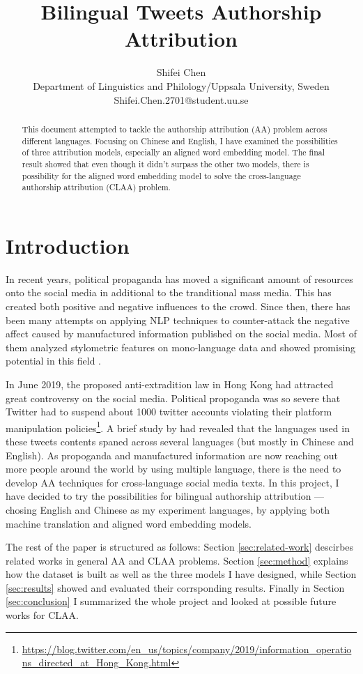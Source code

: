 \documentclass[11pt,a4paper]{article}
\title{Bilingual Tweets Authorship Attribution}
\author{
 Shifei Chen \\
 Department of Linguistics and Philology/Uppsala University, Sweden \\
  {\sf Shifei.Chen.2701@student.uu.se} \\
}
\date{}
\begin{document}
\maketitle
\begin{abstract}
  This document attempted to tackle the authorship attribution (AA) problem across different languages. Focusing on Chinese and English, I have examined the possibilities of three attribution models, especially an aligned word embedding model. The final result showed that even though it didn't surpass the other two models, there is possibility for the aligned word embedding model to solve the cross-language authorship attribution (CLAA) problem.
\end{abstract}

\section{Introduction}
In recent years, political propaganda has moved a significant amount of resources onto the social media in additional to the tranditional mass media. This has created both positive and negative influences to the crowd. Since then, there has been many attempts on applying NLP techniques to counter-attack the negative affect caused by manufactured information published on the social media. Most of them analyzed stylometric features on mono-language data and showed promising potential in this field \cite{rocha2016authorship}.

In June 2019, the proposed anti-extradition law in Hong Kong had attracted great controversy on the social media. Political propoganda was so severe that Twitter had to suspend about 1000 twitter accounts violating their platform manipulation policies\footnote{\raggedright\url{https://blog.twitter.com/en_us/topics/company/2019/information_operations_directed_at_Hong_Kong.html}}. A brief study by \citet{wood_mcminn_feng_2019} had revealed that the languages used in these tweets contents spaned across several languages (but mostly in Chinese and English). As propoganda and manufactured information are now reaching out more people around the world by using multiple language, there is the need to develop AA techniques for cross-language social media texts. In this project, I have decided to try the possibilities for bilingual authorship attribution --- chosing English and Chinese as my experiment languages, by applying both machine translation and aligned word embedding models.

The rest of the paper is structured as follows: Section \ref{sec:related-work} descirbes related works in general AA and CLAA problems. Section \ref{sec:method} explains how the dataset is built as well as the three models I have designed, while Section \ref{sec:results} showed and evaluated their corrsponding results. Finally in Section \ref{sec:conclusion} I summarized the whole project and looked at possible future works for CLAA.
\end{document}
